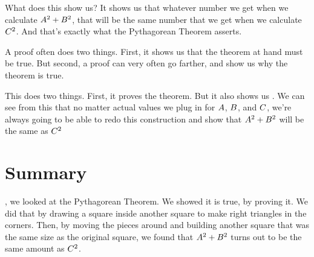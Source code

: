 \documentclass[../../../main.tex]{subfiles}
\begin{document}
What does this show us? It shows us that whatever number we get when we calculate $A^{2} + B^{2}$, that will be the same number that we get when we calculate $C^{2}$. And that's exactly what the Pythagorean Theorem asserts.

\begin{aside}
  \begin{remark}
    A proof often does two things. First, it shows us that the theorem at hand must be true. But second, a proof can very often go farther, and show us why the theorem is true.
  \end{remark}
\end{aside}

This does two things. First, it proves the theorem. But it also shows us . We can see from this that no matter actual values we plug in for $A$, $B$, and $C$, we're always going to be able to redo this construction and show that $A^{2} + B^{2}$ will be the same as $C^{2}$


\section{Summary}

, we looked at the Pythagorean Theorem. We showed it is true, by proving it. We did that by drawing a square inside another square to make right triangles in the corners. Then, by moving the pieces around and building another square that was the same size as the original square, we found that $A^{2} + B^{2}$ turns out to be the same amount as $C^{2}$.
\end{document}
